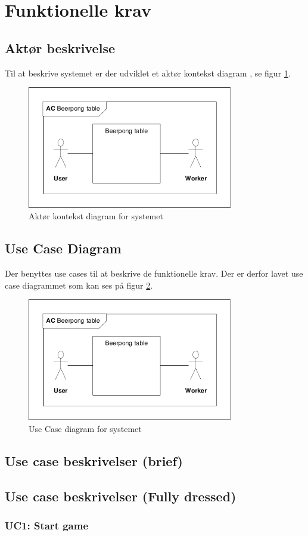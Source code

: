 \documentclass[a4paper,12pt,fleqn,oneside]{article} 	%
\begin{document}
\section{Funktionelle krav}
\subsection{Aktør beskrivelse}
Til at beskrive systemet er der udviklet et aktør kontekst diagram , se figur \ref{fig:Actor-context}.
\begin{figure}[!htb]
    \centering
    \includegraphics[width=0.8\textwidth,trim={0.24in 0.24in 0.24in 0.24in},clip, page=1]{Kravspecifikation/Graphics/Krav-spec-diagrammer.pdf}
    \caption{Aktør kontekst diagram for systemet}
    \label{fig:Actor-context}
\end{figure}

\subsection{Use Case Diagram}
Der benyttes use cases til at beskrive de funktionelle krav. Der er derfor lavet use case diagrammet som kan ses på figur \ref{fig:Use_case}.
\begin{figure}[!htb]
    \centering
    \includegraphics[width=0.8\textwidth,trim={0.24in 0.24in 0.24in 0.24in},clip, page=2]{Kravspecifikation/Graphics/Krav-spec-diagrammer.pdf}
    \caption{Use Case diagram for systemet}
    \label{fig:Use_case}
\end{figure}

\subsection{Use case beskrivelser (brief)}
\subsection{Use case beskrivelser (Fully dressed)}
\subsubsection{UC1: Start game}

\end{document}
